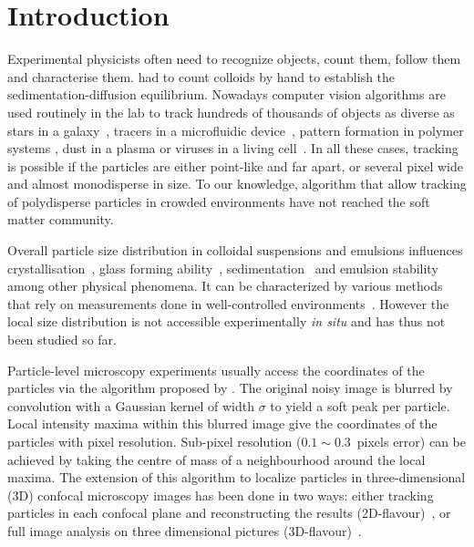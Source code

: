 \documentclass[8.5pt,twoside,twocolumn]{article}
\begin{document}



\section{Introduction}

Experimental physicists often need to recognize objects, count them, follow them and characterise them. \citet{perrin} had to count colloids by hand to establish the sedimentation-diffusion equilibrium. Nowadays computer vision algorithms are used routinely in the lab to track hundreds of thousands of objects as diverse as stars in a galaxy~\cite{Bertin1996}, tracers in a microfluidic device~\cite{Wereley2010}, pattern formation in polymer systems \cite{tanaka1986application,tanaka1989digital}, dust in a plasma or viruses in a living cell~\cite{Brandenburg2007}. In all these cases, tracking is possible if the particles are either point-like and far apart, or several pixel wide and almost monodisperse in size. To our knowledge, algorithm that allow tracking of polydisperse particles in crowded environments have not reached the soft matter community.

Overall particle size distribution in colloidal suspensions and emulsions influences crystallisation~\cite{Pusey1987,Henderson1996,Fasolo2003,Schope2007,pusey2009hard}, glass forming ability~\cite{Pusey1987,Henderson1996,Senkov2001,Schope2007,pusey2009hard}, sedimentation~\cite{Binks1998,Leocmach2010} and emulsion stability~\cite{Biben1993,Binks1998} among other physical phenomena. It can be characterized by various methods that rely on measurements done in well-controlled environments~\cite{Lange1995,Provder1997,Finder2004}. However the local size distribution is not accessible experimentally \emph{in situ} and has thus not been studied so far.

Particle-level microscopy experiments usually access the coordinates of the particles via the algorithm proposed by \citet{Crocker1996}. The original noisy image is blurred by convolution with a Gaussian kernel of width $\sigma$ to yield a soft peak per particle. Local intensity maxima within this blurred image give the coordinates of the particles with pixel resolution. Sub-pixel resolution ($0.1\sim0.3$~pixels error) can be achieved by taking the centre of mass of a neighbourhood around the local maxima. The extension of this algorithm to localize particles in three-dimensional (3D) confocal microscopy images has been done in two ways: either tracking particles in each confocal plane and reconstructing the results (2D-flavour)~\citep{vanblaaderen1995rss, Lu2007}, or full image analysis on three dimensional pictures (3D-flavour)~\citep{dinsmore2001tdc}.
\end{document}
